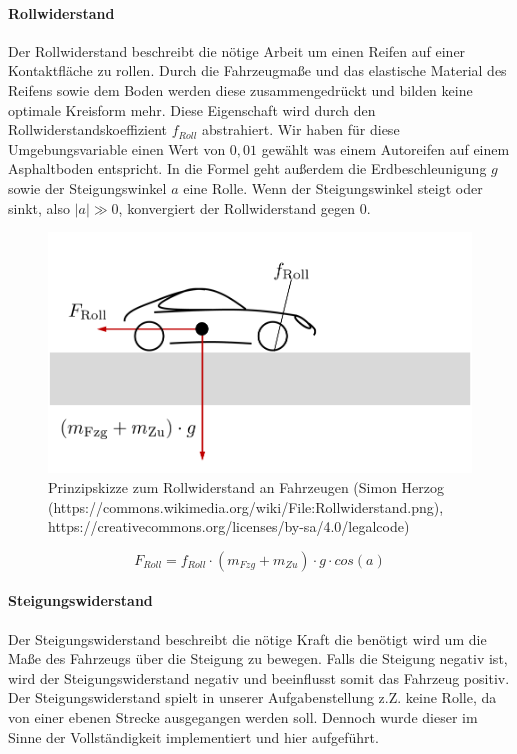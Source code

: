 \documentclass[12pt,a4paper,bibliography=totocnumbered,listof=totocnumbered, abstracton]{scrartcl}
\theoremstyle{Umgebung}
\begin{document}
\paragraph{Rollwiderstand}

Der Rollwiderstand beschreibt die nötige Arbeit um einen Reifen auf einer Kontaktfläche zu rollen. Durch die Fahrzeugmaße und das elastische Material des Reifens sowie dem Boden werden diese zusammengedrückt und bilden keine optimale Kreisform mehr. Diese Eigenschaft wird durch den Rollwiderstandskoeffizient $f_{Roll}$ abstrahiert. Wir haben für diese Umgebungsvariable einen Wert von $0,01$ gewählt was einem Autoreifen auf einem Asphaltboden entspricht. In die Formel geht außerdem die Erdbeschleunigung $g$ sowie der Steigungswinkel  $a$ eine Rolle. Wenn der Steigungswinkel steigt oder sinkt, also $ |a|  \gg 0$, konvergiert der Rollwiderstand gegen $0$. 

\begin{figure}
	\centering
	\includegraphics[width=0.7\linewidth]{img/practical/Rollwiderstand}
	\caption{Prinzipskizze zum Rollwiderstand an Fahrzeugen (Simon Herzog (https://commons.wikimedia.org/wiki/File:Rollwiderstand.png), https://creativecommons.org/licenses/by-sa/4.0/legalcode)}
	\label{fig:Rollwiderstand}
\end{figure}

\begin{equation}
F_{Roll} = f_{Roll} \cdot (m_{Fzg} + m_{Zu}) \cdot g \cdot cos(a)
\end{equation}


\paragraph{Steigungswiderstand}

Der Steigungswiderstand beschreibt die nötige Kraft die benötigt wird um die Maße des Fahrzeugs über die Steigung zu bewegen. Falls die Steigung negativ ist, wird der Steigungswiderstand negativ und beeinflusst somit das Fahrzeug positiv. Der Steigungswiderstand spielt in unserer Aufgabenstellung z.Z. keine Rolle, da von einer ebenen Strecke ausgegangen werden soll. Dennoch wurde dieser im Sinne der Vollständigkeit implementiert und hier aufgeführt.
\end{document}
